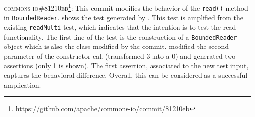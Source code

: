 
\textsc{commons-io\#81210eb}\footnote{\url{https://github.com/apache/commons-io/commit/81210eb}}: This commit modifies the behavior of the \texttt{read()} method in \texttt{BoundedReader}.
 shows the test generated by \DCII.
This test is amplified from the existing \texttt{readMulti} test, which indicates that the intention is to test the read functionality.
The first line of the test is the construction of a \texttt{BoundedReader} object which is also the class modified by the commit.
\DCII modified the second parameter of the constructor call (transformed $3$ into a $0$) and generated two assertions (only 1 is shown).
The first assertion, associated to the new test input, captures the behavioral difference.
Overall, this can be considered as a successful amplication.

